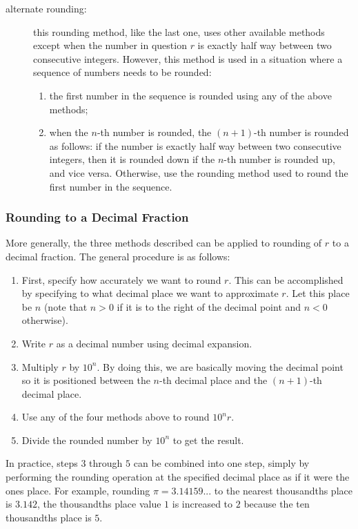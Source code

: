 \documentclass[12pt]{article}
\begin{document}
\begin{description}
\item[alternate rounding:] this rounding method, like the last one, uses other available methods except when the number in question $r$ is exactly half way between two consecutive integers.  However, this method is used in a situation where a sequence of numbers needs to be rounded:  
\begin{enumerate}
\item
the first number in the sequence is rounded using any of the above methods;
\item
when the $n$-th number is rounded, the $(n+1)$-th number is rounded as follows: if the number is exactly half way between two consecutive integers, then it is rounded down if the $n$-th number is rounded up, and vice versa.  Otherwise, use the rounding method used to round the first number in the sequence.
\end{enumerate}
\end{description}

\subsubsection*{Rounding to a Decimal Fraction}

More generally, the three methods described can be applied to rounding of $r$ to a decimal fraction.  The general procedure is as follows:
\begin{enumerate}
\item
First, specify how accurately we want to round $r$.  This can be accomplished by specifying to what decimal place we want to approximate $r$.  Let this place be $n$ (note that $n>0$ if it is to the right of the decimal point and $n<0$ otherwise).
\item
Write $r$ as a decimal number using decimal expansion.
\item
Multiply $r$ by $10^n$.  By doing this, we are basically moving the decimal point so it is positioned between the $n$-th decimal place and the $(n+1)$-th decimal place.
\item
Use any of the four methods above to round $10^nr$.
\item
Divide the rounded number by $10^n$ to get the result.
\end{enumerate}

In practice, steps $3$ through $5$ can be combined into one step, simply by performing the rounding operation at the specified decimal place as if it were the ones place.  For example, rounding $\pi=3.14159...$ to the nearest thousandths place is $3.142$, the thousandths place value $1$ is increased to $2$ because the ten thousandths place is $5$.
\end{document}
